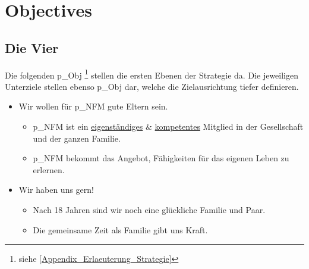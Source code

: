 
\pagebreak

\section{Objectives} 

\subsection{Die Vier}

Die folgenden \gls{p_Obj} \footnote{siehe \ref{Appendix_Erlaeuterung_Strategie}} stellen die ersten Ebenen der Strategie da. Die jeweiligen Unterziele stellen ebenso \gls{p_Obj} dar, welche die Zielausrichtung tiefer definieren.

\begin{itemize}
	\item Wir wollen für \gls{p_NFM} gute Eltern sein.
	\begin{itemize}
	\item \gls{p_NFM} ist ein \underline{eigenständiges} $\&$ \underline{kompetentes} Mitglied in der Gesellschaft und der ganzen Familie. \label{NFM_O_1}
	\item \gls{p_NFM} bekommt das Angebot, Fähigkeiten für das eigenen Leben zu erlernen. \label{NFM_O_2}
	\end{itemize}
	\item Wir haben uns gern!
	\begin{itemize}
	\item Nach 18 Jahren sind wir noch eine glückliche Familie und Paar.\label{NFM_O_4}
 	\item Die gemeinsame Zeit als Familie gibt uns Kraft. \label{NFM_O_3}
	\end{itemize}
\end{itemize}


